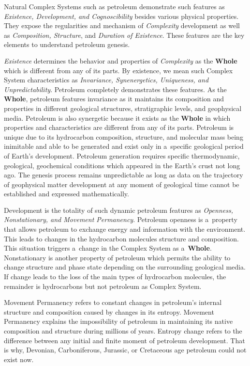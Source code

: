 \begin{multicols}{2}
Natural Complex Systems such as petroleum demonstrate such features as \textit{Existence, 
Development, and Cognoscibility} besides various physical properties. They expose the 
regularities and mechanism of \textit{Complexity} development as well as \textit{Composition, 
Structure}, and \textit{Duration of Existence}. These features are the key elements to 
understand petroleum genesis. 

\textit{Existence} determines the behavior and properties of \textit{Complexity} as the 
\textbf{Whole} which is different from any of its parts. By existence, we mean such Complex 
System characteristics as \textit{Invariance, Synenergetics, Uniqueness, and Unpredictability}. 
Petroleum completely demonstrates these features. As the \textbf{Whole}, petroleum features 
invariance as it maintains its composition and properties in different geological structures, 
stratigraphic levels, and geophysical media. Petroleum is also synergetic because it exists as the 
\textbf{Whole} in which properties and characteristics are different from any of its parts. 
Petroleum is unique due to its hydrocarbon composition, structure, and molecular mass being 
inimitable and able to be generated and exist only in a~specific geological period of Earth's 
development. Petroleum generation requires specific thermodynamic, geological, geochemical 
conditions which appeared in the Earth's crust not long ago. The genesis process remains 
unpredictable as long as data on the trajectory of geophysical matter development at any moment 
of geological time cannot be established and expressed mathematically.    

Development is the totality of such dynamic petroleum features as \textit{Openness,  
Nonstationary, and Movement Permanency}. Petroleum openness is a~property that allows 
petroleum to exchange energy and information with the environment. This leads to changes in 
the hydrocarbon molecules structure and composition. This situation triggers a~change in the 
Complex System as a~\textbf{Whole}. Nonstationary is another property of petroleum which 
permits the ability to change structure and phase state depending on the surrounding geological 
media. If change leads to the loss of the main types of hydrocarbon molecules, the remainder is 
hydrocarbons but not petroleum as Complex System.  

Movement Permanency refers to constant changes in petroleum's internal structure and 
composition caused by changes in its entropy. Movement Permanency explains the impossibility 
of petroleum in maintaining its native composition and structure during millions of years. 
Entropy change refers to the difference between any initial and finite moment of petroleum 
development. That is why, Devonian, Carboniferous, Jurassic, or Cretaceous age petroleum could 
not exist now.


\end{multicols}
